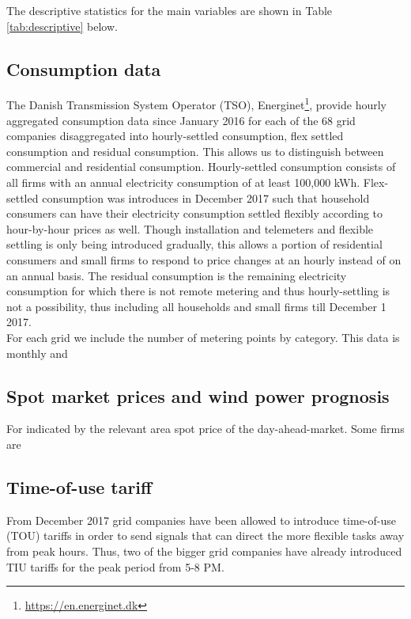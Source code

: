 \label{sec:data}
The descriptive statistics for the main variables are shown in Table \ref{tab:descriptive} below.

\subsection{Consumption data}
\label{subsec:d_consumption}
The Danish Transmission System Operator (TSO), Energinet\footnote{\url{https://en.energinet.dk}}, provide hourly aggregated consumption data since January 2016 for each of the 68 grid companies disaggregated into hourly-settled consumption, flex settled consumption and residual consumption. This allows us to distinguish between commercial and residential consumption. Hourly-settled consumption consists of all firms with an annual electricity consumption of at least 100,000 kWh. Flex-settled consumption was introduces in December 2017 such that household consumers can have their electricity consumption settled flexibly according to hour-by-hour prices as well. Though installation and telemeters and flexible settling is only being introduced gradually, this allows a portion of residential consumers and small firms to respond to price changes at an hourly instead of on an annual basis. The residual consumption is the remaining electricity consumption for which there is not remote metering and thus hourly-settling is not a possibility, thus including all households and small firms till December 1 2017.
\medskip\\
For each grid we include the number of metering points by category. This data is monthly and

\subsection{Spot market prices and wind power prognosis}
\label{subsec:d_spot}
For  indicated by the relevant area spot price of the day-ahead-market. Some firms are

\subsection{Time-of-use tariff}
\label{subsec:d_tout}
From December 2017 grid companies have been allowed to introduce time-of-use (TOU) tariffs in order to send signals that can direct the more flexible tasks away from peak hours. Thus, two of the bigger grid companies have already introduced TIU tariffs for the peak period from 5-8 PM.

